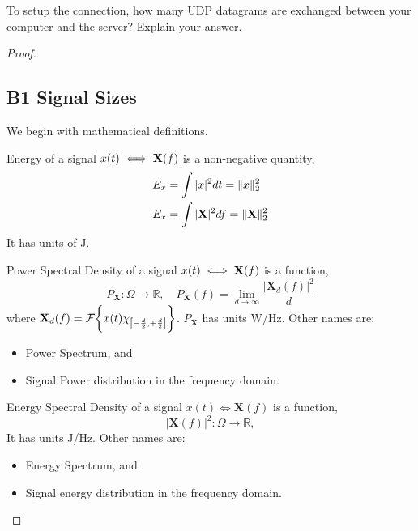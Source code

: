 \documentclass[../../main.tex]{subfiles}
\begin{document}
\begin{wts}
To setup the connection, how many UDP datagrams are exchanged between your computer and the server? Explain your answer.
\end{wts}
\begin{proof}

\newcommand{\pxf}{P_{\mathbf{X}}(f)}
\newcommand{\pyf}{P_{\mathbf{y}}(f)}
\newcommand{\hf}{\mathbf{H}(f)}
\newcommand{\xf}{\mathbf{X}(f)}
\newcommand{\yf}{\mathbf{Y}(f)}
\subsection*{B1 Signal Sizes}
We begin with mathematical definitions.
\begin{definition}
    Energy of a signal $x(t)\iff \bf{X}(f)$ is a non-negative quantity,
    \begin{align*}
        E_x&=\int |x|^2dt = \norm{x}_2^2\\
        E_x&= \int |\bf{X}|^2df = \norm{\bf{X}}_2^2
    \end{align*}
    It has units of J.
\end{definition}
\begin{definition}
    Power Spectral Density of a signal $x(t)\iff \bf{X}(f)$ is a function,
    \[
    P_{\mathbf{X}}:\Omega\to\mathbb{R},\quad P_{\mathbf{X}} (f) = \lim_{d\to\infty} \dfrac{|\mathbf{X}_d (f)|^2}{d}
    \]
    where $\mathbf{X}_d (f) = \cal{F}\biggl\{x(t)\chi_{\left[-\frac{d}{2},+\frac{d}{2}\right]}\biggr\}$. $P_{\mathbf{X}}$ has units W/Hz. Other names are:
    \begin{itemize}
        \item Power Spectrum, and
        \item Signal Power distribution in the frequency domain.
    \end{itemize}
\end{definition}
\begin{definition}
    Energy Spectral Density of a signal $x(t)\iff \mathbf{X}(f)$ is a function,
    \[
    |\mathbf{X}(f)|^2: \Omega\to\mathbb{R},
    \]
    It has units J/Hz. Other names are:
    \begin{itemize}
        \item Energy Spectrum, and
        \item Signal energy distribution in the frequency domain.
    \end{itemize}

\end{definition}
\end{proof}
\end{document}

